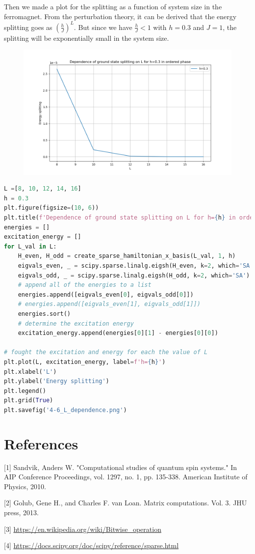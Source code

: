 \documentclass[12pt]{article}
\begin{document}
Then we made a plot for the splitting as a function of system size in the ferromagnet. From the perturbation theory, it can be derived that the energy splitting goes as $\left(\frac{h}{J}\right)^L$. But since we have $\frac{h}{J}<1$ with $h=0.3$ and $J=1$, the splitting will be exponentially small in the system size.
\begin{figure}[h]
\centering
\includegraphics[width=\textwidth]{4-6_L_dependence.png}
\label{4-6_L_dependence.png}
\end{figure}
\begin{lstlisting}[language=Python]
L =[8, 10, 12, 14, 16]
h = 0.3
plt.figure(figsize=(10, 6))
plt.title(f'Dependence of ground state splitting on L for h={h} in ordered phase')
energies = []
excitation_energy = []
for L_val in L:
    H_even, H_odd = create_sparse_hamiltonian_x_basis(L_val, 1, h)
    eigvals_even, _ = scipy.sparse.linalg.eigsh(H_even, k=2, which='SA')
    eigvals_odd, _ = scipy.sparse.linalg.eigsh(H_odd, k=2, which='SA')
    # append all of the energies to a list
    energies.append([eigvals_even[0], eigvals_odd[0]])
    # energies.append([eigvals_even[1], eigvals_odd[1]])
    energies.sort()
    # determine the excitation energy
    excitation_energy.append(energies[0][1] - energies[0][0])

# fought the excitation and energy for each the value of L
plt.plot(L, excitation_energy, label=f'h={h}')
plt.xlabel('L')
plt.ylabel('Energy splitting')
plt.legend()
plt.grid(True)
plt.savefig('4-6_L_dependence.png')
\end{lstlisting}
\newpage





\section*{References}
[1] Sandvik, Anders W. "Computational studies of quantum spin systems." In AIP Conference Proceedings, vol. 1297, no. 1, pp. 135-338. American Institute of Physics, 2010.

[2] Golub, Gene H., and Charles F. van Loan. Matrix computations. Vol. 3. JHU press, 2013.

[3] \href{https://en.wikipedia.org/wiki/Bitwise_operation}{https://en.wikipedia.org/wiki/Bitwise\_operation}

[4] \href{https://docs.scipy.org/doc/scipy/reference/sparse.html}{https://docs.scipy.org/doc/scipy/reference/sparse.html}
\end{document}
